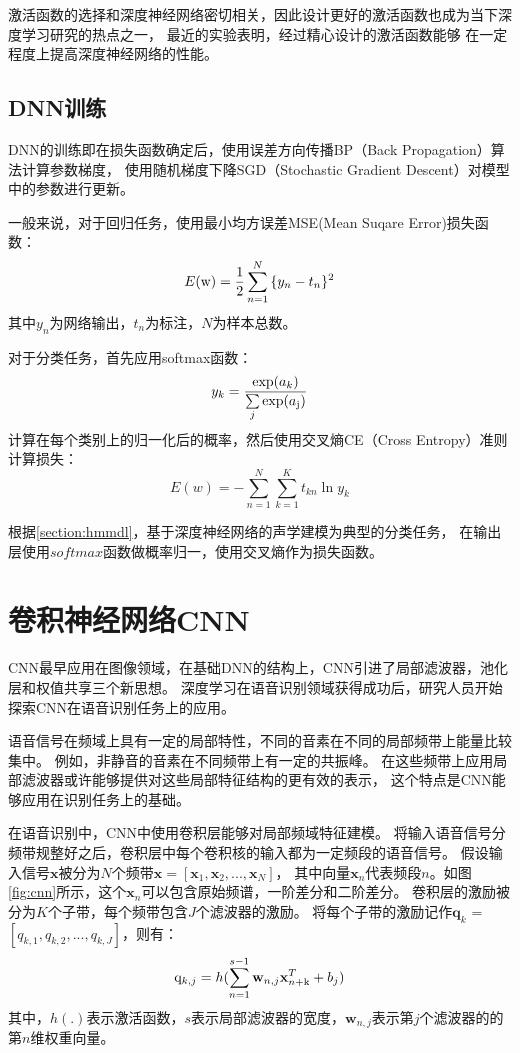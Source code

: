 激活函数的选择和深度神经网络密切相关，因此设计更好的激活函数也成为当下深度学习研究的热点之一，
最近的实验表明，经过精心设计的激活函数能够
在一定程度上提高深度神经网络的性能。

\subsection{DNN训练}

DNN的训练即在损失函数确定后，使用误差方向传播BP（Back Propagation）算法计算参数梯度，
使用随机梯度下降SGD（Stochastic Gradient Descent）对模型中的参数进行更新。

一般来说，对于回归任务，使用最小均方误差MSE(Mean Suqare Error)损失函数：
\begin{equation}
E({\rm{w}}) = \frac{1}{2}\sum\limits_{n = 1}^N {\{ {y_n}}  - {t_n}{\} ^2}
\end{equation}
其中$y_n$为网络输出，$t_n$为标注，$N$为样本总数。

对于分类任务，首先应用softmax函数：
\begin{equation}
\label{equation:softmax}
{y_k} = \frac{{\exp ({a_k})}}{{\sum\limits_j {\exp ({a_{\rm{j}}})} }}
\end{equation}
计算在每个类别上的归一化后的概率，然后使用交叉熵CE（Cross Entropy）准则计算损失：
\begin{equation}
E(w) =  - \sum\limits_{n = 1}^N {\sum\limits_{k = 1}^K {{t_{kn}}\ln {y_k}} }
\end{equation}

根据\ref{section:hmmdl}，基于深度神经网络的声学建模为典型的分类任务，
在输出层使用$softmax$函数做概率归一，使用交叉熵作为损失函数。

\section{卷积神经网络CNN}

CNN最早应用在图像领域，在基础DNN的结构上，CNN引进了局部滤波器，池化层和权值共享三个新思想。
深度学习在语音识别领域获得成功后，研究人员开始探索CNN在语音识别任务上的应用。

语音信号在频域上具有一定的局部特性，不同的音素在不同的局部频带上能量比较集中。
例如，非静音的音素在不同频带上有一定的共振峰。
在这些频带上应用局部滤波器或许能够提供对这些局部特征结构的更有效的表示，
这个特点是CNN能够应用在识别任务上的基础。

在语音识别中，CNN中使用卷积层能够对局部频域特征建模。
将输入语音信号分频带规整好之后，卷积层中每个卷积核的输入都为一定频段的语音信号。
假设输入信号$\textbf{x}$被分为$N$个频带$\textbf{x}= [\textbf{x}_1, \textbf{x}_2, ..., \textbf{x}_N]$，
其中向量$\textbf{x}_n$代表频段$n$。如图\ref{fig:cnn}所示，这个$\textbf{x}_n$可以包含原始频谱，一阶差分和二阶差分。
卷积层的激励被分为$K$个子带，每个频带包含$J$个滤波器的激励。
将每个子带的激励记作$\textbf{q}_k$ = $[q_{k,1}, q_{k,2}, ..., q_{k, J}]$，则有：
\begin{equation}
{{\rm{q}}_{k,j}} = h(\sum\limits_{n = 1}^{s - 1} {{\textbf{w}_{n,j}}\textbf{x}_{n{\rm{ + k}}}^T + {b_j})}
\end{equation}
其中，$h(.)$表示激活函数，$s$表示局部滤波器的宽度，$\textbf{w}_{n,j}$表示第$j$个滤波器的的第$n$维权重向量。


